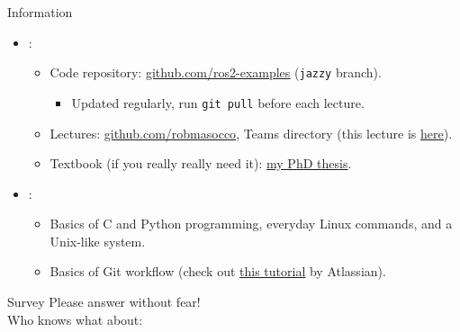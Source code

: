 \begin{frame}{Information}
  \justifying
	\begin{itemize}
		\item {}:
		      \begin{itemize}
			      \item Code repository: \href{https://github.com/IntelligentSystemsLabUTV/ros2-examples}{\color{blue}\underline{github.com/ros2-examples}} (\texttt{jazzy} branch).
			      \begin{itemize}
              \item Updated regularly, run \texttt{git~pull} before each lecture.
            \end{itemize}
			      \item Lectures: \href{https://github.com/stars/robmasocco/lists/dafn26}{\color{blue}\underline{github.com/robmasocco}}, Teams directory (this lecture is \href{https://github.com/robmasocco/DAFN26_Robotics_1}{\color{blue}\underline{here}}).
			      \item Textbook (if you really really need it): \href{http://dx.doi.org/10.13140/RG.2.2.30948.90247}{\color{blue}\underline{my PhD thesis}}.
		      \end{itemize}
		\item {}:
		      \begin{itemize}
			      \item Basics of C and Python programming, everyday Linux commands, and a Unix-like system.
			      \item Basics of Git workflow (check out \href{https://www.atlassian.com/git/tutorials/what-is-git}{\color{blue}\underline{this tutorial}} by Atlassian).
		      \end{itemize}
	\end{itemize}
\end{frame}

\begin{frame}{Survey}
  \justifying
	Please answer without fear!\\
	\bigskip
	Who knows what about:
	\begin{itemize}
	\end{itemize}
\end{frame}

